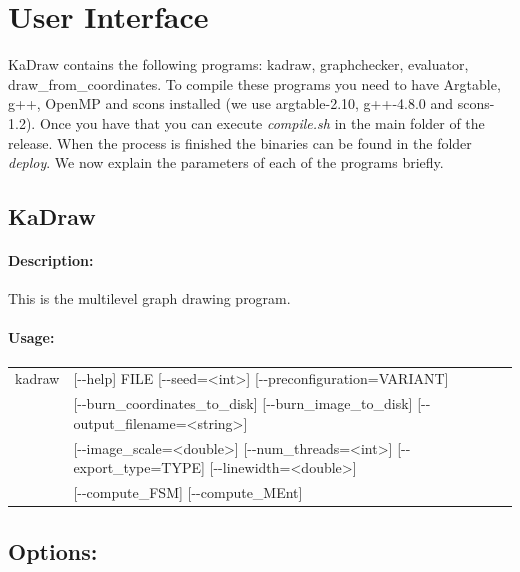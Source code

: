 \documentclass[11pt]{article}
\begin{document}
\vfill
\pagebreak
\section{User Interface}
KaDraw contains the following programs: kadraw, graphchecker, evaluator, draw\_from\_coordinates. To compile these programs you need to have Argtable, g++, OpenMP and scons installed (we use argtable-2.10, g++-4.8.0 and scons-1.2). Once you have that you can execute \emph{compile.sh} in the main folder of the release. When the process is finished the binaries can be found in the folder \emph{deploy}. We now explain the parameters of each of the programs briefly.
\subsection{KaDraw}
\paragraph*{Description:} This is the multilevel graph drawing program. 
\paragraph*{Usage:\\} 

\begin{tabular}{ll}
kadraw &   [-{}-help] FILE [-{}-seed=<int>] [-{}-preconfiguration=VARIANT]  \\
& [-{}-burn\_coordinates\_to\_disk] [-{}-burn\_image\_to\_disk] [-{}-output\_filename=<string>] \\ 
& [-{}-image\_scale=<double>] [-{}-num\_threads=<int>] [-{}-export\_type=TYPE] [-{}-linewidth=<double>] \\ 
& [-{}-compute\_FSM] [-{}-compute\_MEnt]

\end{tabular}
                          
\subsection*{Options:\\}
\end{document}

